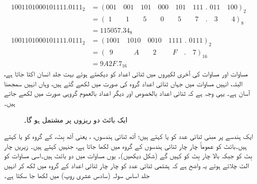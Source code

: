  \begin{align*}
 1001101000101111.0111_2&=(001\quad 001\quad 101\quad 000\quad 101\quad 111\,\, . \,\,011\quad 100)_2\\
 &=(\,\,1\quad \quad 1\quad \quad 5\quad \quad 0 \quad \quad 5\quad \quad 7\quad .\quad 3\quad \quad 4)_8\\
 &=115057.34_8\\
 1001101000101111.0111_2&=(1001\quad 1010\quad 0010\quad 1111\,\, . \,\,0111)_2\\
 &=(\,\,\,9\quad \quad \quad A\quad \quad 2\quad \quad \,\,F \quad . \quad 7)_{16}\\
 &=9A2F.7_{16}
 \end{align*}
	مساوات  اور مساوات  کی آخری لکیروں میں ثنائی اعداد کو دیکھتے ہوئے بہت جلد انسان اکتا جاتا ہے، البتہ، انہیں مساوات میں جہاں ثنائی اعداد گروہ کی صورت میں لکھے گئے ہیں، وہاں انہیں سمجھنا آسان ہے۔ یہی وجہ ہے کہ ثنائی اعداد بالخصوص اور دیگر اعداد بالعموم گروہی صورت میں لکھے جاتے ہیں۔
	
\begin{figure}
\centering
{}
\caption{ایک بائٹ دو ریزوں پر مشتمل ہو گا۔}
\label{شکل_ثنائی_ریزہ}
\end{figure}

ایک ہندسے پر مبنی ثنائی عدد کو  یا   کہتے ہیں؛ آٹھ ثنائی ہندسوں، ، یعنی آٹھ بِٹ، کے گروہ کو  یا   کہتے ہیں۔بائٹ کو عموماً چار چار ثنائی  ہندسوں  کے گروہ میں لکھا جاتا ہے، جنہیں کہتے ہیں۔  زیریں چار بِٹ کو  جبکہ  بالا چار بِٹ کو  کہیں گے (شکل   دیکھیں)۔ یوں مساوات  میں دو بائٹ ہیں۔اسی مساوات کو الٹ چلاتے ہوئے یہ واضح ہے کہ ہشتمی ثنائی عدد کو چار چار ثنائی اعداد کے گروہ میں لکھ کر انہیں جلد اساس سولہ (سادس عشری روپ)   میں لکھا جا سکتا ہے۔

